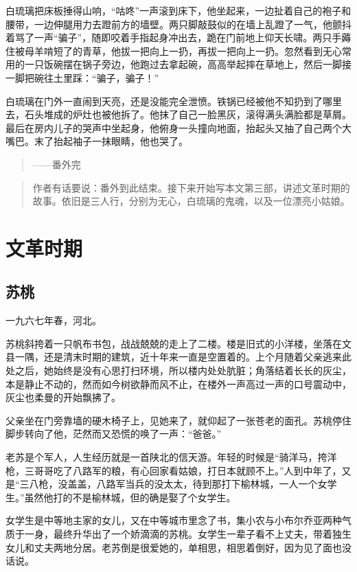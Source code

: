 白琉璃把床板捶得山响，``咕咚''一声滚到床下，他坐起来，一边扯着自己的袍子和腰带，一边伸腿用力去蹬前方的墙壁。两只脚敲鼓似的在墙上乱蹬了一气，他颤抖着骂了一声``骗子''，随即咬着手指起身冲出去，跪在门前地上仰天长啸。两只手薅住被母羊啃短了的青草，他拔一把向上一扔，再拔一把向上一扔。忽然看到无心常用的一只饭碗摆在锅子旁边，他跑过去拿起碗，高高举起摔在草地上，然后一脚接一脚把碗往土里踩：``骗子，骗子！''

白琉璃在门外一直闹到天亮，还是没能完全泄愤。铁锅已经被他不知扔到了哪里去，石头堆成的炉灶也被他拆了。他抹了自己一脸黑灰，滚得满头满脸都是草屑。最后在房内儿子的哭声中坐起身，他俯身一头撞向地面，抬起头又抽了自己两个大嘴巴。末了抬起袖子一抹眼睛，他也哭了。

\begin{quote}
——番外完
\end{quote}

\begin{quote}
作者有话要说：番外到此结束。接下来开始写本文第三部，讲述文革时期的故事。依旧是三人行，分别为无心，白琉璃的鬼魂，以及一位漂亮小姑娘。
\end{quote}

\part{文革时期}

\chapter{苏桃}

一九六七年春，河北。

苏桃斜挎着一只帆布书包，战战兢兢的走上了二楼。楼是旧式的小洋楼，坐落在文县一隅，还是清末时期的建筑，近十年来一直是空置着的。上个月随着父亲逃来此处之后，她始终是没有心思打扫环境，所以楼内处处肮脏；角落结着长长的灰尘，本是静止不动的，然而如今树欲静而风不止，在楼外一声高过一声的口号震动中，灰尘也柔曼的开始飘拂了。

父亲坐在门旁靠墙的硬木椅子上，见她来了，就仰起了一张苍老的面孔。苏桃停住脚步转向了他，茫然而又恐慌的唤了一声：``爸爸。''

老苏是个军人，人生经历就是一首陕北的信天游。年轻的时候是``骑洋马，挎洋枪，三哥哥吃了八路军的粮，有心回家看姑娘，打日本就顾不上。''人到中年了，又是``三八枪，没盖盖，八路军当兵的没太太，待到那打下榆林城，一人一个女学生。''虽然他打的不是榆林城，但的确是娶了个女学生。

女学生是中等地主家的女儿，又在中等城市里念了书，集小农与小布尔乔亚两种气质于一身，最终升华出了一个娇滴滴的苏桃。女学生一辈子看不上丈夫，带着独生女儿和丈夫两地分居。老苏倒是很爱她的，单相思，相思着倒好，因为见了面也没话说。

